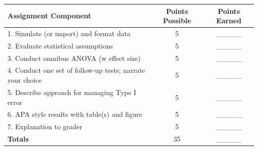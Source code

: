 \documentclass[
  english,
]{book}
\begin{document}
\begin{longtable}[]{@{}lcc@{}}
\toprule
Assignment Component & Points Possible & Points Earned \\
\midrule
\endhead
1. Simulate (or import) and format data & 5 & \_\_\_\_\_ \\
2. Evaluate statistical assumptions & 5 & \_\_\_\_\_ \\
3. Conduct omnibus ANOVA (w effect size) & 5 & \_\_\_\_\_ \\
4. Conduct one set of follow-up tests; narrate your choice & 5 & \_\_\_\_\_ \\
5. Describe approach for managing Type I error & 5 & \_\_\_\_\_ \\
6. APA style results with table(s) and figure & 5 & \_\_\_\_\_ \\
7. Explanation to grader & 5 & \_\_\_\_\_ \\
\textbf{Totals} & 35 & \_\_\_\_\_ \\
\bottomrule
\end{longtable}
\end{document}
